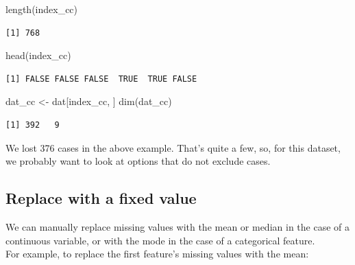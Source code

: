 \documentclass[
]{book}
\newenvironment{Shaded}{\begin{snugshade}}{\end{snugshade}}
\newcommand{\AttributeTok}[1]{\textcolor[rgb]{0.77,0.63,0.00}{#1}}
\newcommand{\ConstantTok}[1]{\textcolor[rgb]{0.00,0.00,0.00}{#1}}
\newcommand{\FunctionTok}[1]{\textcolor[rgb]{0.00,0.00,0.00}{#1}}
\newcommand{\NormalTok}[1]{#1}
\newcommand{\OtherTok}[1]{\textcolor[rgb]{0.56,0.35,0.01}{#1}}
\newcommand{\SpecialCharTok}[1]{\textcolor[rgb]{0.00,0.00,0.00}{#1}}
\begin{document}
\begin{Shaded}
\begin{Highlighting}[]
\FunctionTok{length}\NormalTok{(index\_cc)}
\end{Highlighting}
\end{Shaded}

\begin{verbatim}
[1] 768
\end{verbatim}

\begin{Shaded}
\begin{Highlighting}[]
\FunctionTok{head}\NormalTok{(index\_cc)}
\end{Highlighting}
\end{Shaded}

\begin{verbatim}
[1] FALSE FALSE FALSE  TRUE  TRUE FALSE
\end{verbatim}

\begin{Shaded}
\begin{Highlighting}[]
\NormalTok{dat\_cc }\OtherTok{\textless{}{-}}\NormalTok{ dat[index\_cc, ]}
\FunctionTok{dim}\NormalTok{(dat\_cc)}
\end{Highlighting}
\end{Shaded}

\begin{verbatim}
[1] 392   9
\end{verbatim}

We lost 376 cases in the above example. That's quite a few, so, for this dataset, we probably want to look at options that do not exclude cases.

\hypertarget{replace-with-a-fixed-value}{%
\subsection{Replace with a fixed value}\label{replace-with-a-fixed-value}}

We can manually replace missing values with the mean or median in the case of a continuous variable, or with the mode in the case of a categorical feature.\\
For example, to replace the first feature's missing values with the mean:

\begin{Shaded}
\end{Shaded}
\end{document}
